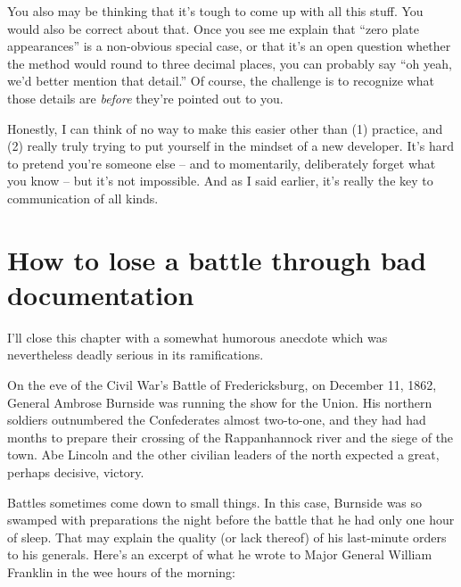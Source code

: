 You also may be thinking that it's tough to come up with all this stuff. You
would also be correct about that. Once you see me explain that ``zero plate
appearances'' is a non-obvious special case, or that it's an open question
whether the method would round to three decimal places, you can probably say
``oh yeah, we'd better mention that detail.'' Of course, the challenge is to
recognize what those details are \textit{before} they're pointed out to you.

Honestly, I can think of no way to make this easier other than (1) practice,
and (2) really truly trying to put yourself in the mindset of a new developer.
It's hard to pretend you're someone else -- and to momentarily, deliberately
forget what you know -- but it's not impossible. And as I said earlier, it's
really the key to communication of all kinds.

\section{How to lose a battle through bad documentation}

I'll close this chapter with a somewhat humorous anecdote which was
nevertheless deadly serious in its ramifications.

On the eve of the Civil War's Battle of Fredericksburg, on December 11, 1862,
General Ambrose Burnside was running the show for the Union. His northern
soldiers outnumbered the Confederates almost two-to-one, and they had had
months to prepare their crossing of the Rappanhannock river and the siege of
the town. Abe Lincoln and the other civilian leaders of the north expected a
great, perhaps decisive, victory.

Battles sometimes come down to small things. In this case, Burnside was so
swamped with preparations the night before the battle that he had only one
hour of sleep. That may explain the quality (or lack thereof) of his
last-minute orders to his generals. Here's an excerpt of what he wrote to
Major General William Franklin in the wee hours of the morning:


\begin{center}
\large
{}
\end{center}

